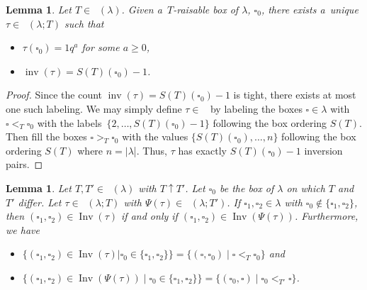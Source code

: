 \documentclass[pdftex]{sigma}
\numberwithin{equation}{section}
\newtheorem{Lemma}[Theorem]{Lemma}
\theoremstyle{definition}
\DeclareMathOperator{\PSYT}{\mathrm{PSYT}_{\geq 0}}
\DeclareMathOperator{\RSSYT}{\mathrm{RSSYT}_{\geq 0}}
\DeclareMathOperator{\Inv}{\mathrm{Inv}}
\DeclareMathOperator{\inv}{inv}
\begin{document}
\begin{Lemma}\label{minimal inversion set for raisable labeling}
 Let $T\in \RSSYT(\lambda)$. Given a~$T$-raisable box of $\lambda$, $\square_0$, there exists a~unique $\tau \in \PSYT(\lambda;T)$ such that
 \begin{itemize}
\itemsep=0pt
 \item $\tau(\square_0)= 1q^{a}$ for some $a \geq 0$,
 \item $\inv(\tau) = S(T)(\square_0) -1$.
 \end{itemize}
\end{Lemma}

\begin{proof}
 Since the count $\inv(\tau) = S(T)(\square_0) -1$ is tight, there exists at most one such labeling. We may simply define $\tau \in \PSYT$ by labeling the boxes $\square \in \lambda$ with $\square <_{T} \square_0$ with the labels~${\{2,\dots, S(T)(\square_0) -1 \}}$ following the box ordering $S(T)$. Then fill the boxes $\square >_T \square_0$ with the values $\{ S(T)(\square_0),\dots, n\}$ following the box ordering $S(T)$ where $n = |\lambda$|. Thus, $\tau$ has exactly $S(T)(\square_0) -1$ inversion pairs.
\end{proof}

\begin{Lemma}\label{inversion sets and raising}
 Let $T,T' \in \RSSYT(\lambda)$ with $T\uparrow T'$. Let $\square_0$ be the box of $\lambda$ on which $T$ and $T'$ differ.
 Let $\tau \in \PSYT(\lambda;T)$ with $\Psi(\tau) \in \PSYT(\lambda;T')$. If $\square_1,\square_2 \in \lambda$ with $\square_0 \notin \{\square_1,\square_2\}$, then $(\square_1,\square_2) \in \Inv(\tau)$ if and only if $(\square_1,\square_2) \in \Inv(\Psi(\tau))$. Furthermore, we have
 \begin{itemize}
\itemsep=0pt
 \item $\{(\square_1,\square_2) \in \Inv(\tau)| \square_0 \in \{\square_1,\square_2\} \} = \{ (\square,\square_0) \mid \square <_{T} \square_0\}$ and
 \item $\{(\square_1,\square_2) \in \Inv(\Psi(\tau)) \mid \square_0 \in \{\square_1,\square_2\}\} = \{ (\square_0,\square) \mid \square_0 <_{T'} \square\}$.
 \end{itemize}
\end{Lemma}
\end{document}
